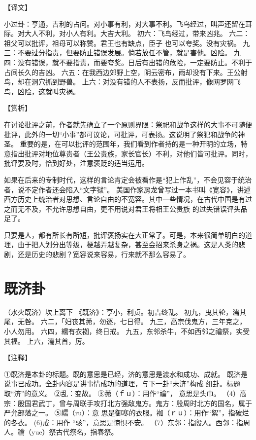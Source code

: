 \documentclass[12pt,UTF8]{ctexbook}
\begin{document}
【译文】

小过卦：亨通，吉利的占问。对小事有利，对大事不利。飞鸟经过，叫声还留在耳际。对大人不利，对小人有利。大吉大利。
初六：飞鸟经过，带来凶兆。
六二：祖父可以批评，祖母可以称赞。君王也有缺点，臣子 也可以夸奖。没有灾祸。
九三：不要过分指责，但要防止错误发展。倘若放任不管，就是害他。凶险。
九四：没有错误，就不要指责，而要夸奖。日后有出错的危险，一定要防止。不利于占间长久的吉凶。
六五：在我西边郊野上空，阴云密布，雨却没有下来。王公射鸟，却在洞穴抓到野兽。
上六：对没有错的人不表扬，反而批评，像网罗网飞鸟，凶险，这就叫灾祸。

【赏析】

在讨论批评之前，作者就先确立了一个原则界限：祭祀和战争这样的大事不可随便批评，此外的一切“小事”都可议论，可批评，可表扬。这说明了祭犯和战争的神圣。 重要的是，在可以批评的范围年，我们看到作者持的是一种开明的立场，特意指出批评对地位尊贵者（王公贵族，家长官长）不利，对他们皆可批评。同时，批评要及时，恰到好处，注意褒贬的适当运用。

如果在后来的专制时代，这样的言论肯定会被看作是“犯上作乱”，不会见容于统治者，说不定作者还会陷入“文字狱”。 美国作家房龙曾写过一本书叫《宽容》，讲述西方历史上统治者对思想、言论自由的不宽容。其中一些情况，在古代中国是有过之而无不及，不允许思想自由，更不用说对君王将相王公贵族 的过失错误评头品足了。

只要是人，都有所长有所短，批评褒扬实在大正常了。可是，本来很简单明白的道理，由于把人划分出等级，梗越弄越复杂，甚至会招来杀身之祸。这是人类的悲剧，还是历史的悲剧？宽容说来容易，行来就不那么容易了。

\chapter{既济卦}

（水火既济）坎上离下
《既济》：亨小，利贞。初吉终乱。
初九，曳其轮，濡其尾，无咎。
六二，「妇丧其茀，勿逐，七日得。
九三，高宗伐鬼方，三年克之，小人勿用。
六四，繻有衣袽，终日戒。
九五，东邻杀牛，不如西邻之禴祭，实受其福。
上六，濡其首，厉。

【注释】

①既济是本卦的标题。既的意思是已经，济的意思是渡水和成功、成就。 既济是说事已成功。全卦内容是讲事情成功的道理，与下一卦“未济”构成 组卦。标题取“济”的意义。
②乱：变故。
③茀（ｆｕ）：用作“禴”， 意思是头巾。
（4）高宗：殷国君武丁，曾与周联手攻打北方强敌鬼方。鬼方：殷周时北方的国名，属于严允部落之一。
⑤繻（ru）：意 思是御寒的衣服。袽（ｒｕ）：用作“絮”，指破烂的冬衣。
(6)戒：用作 “骇”，意思是惊惧不安。
（7）东邻：指殷人。西邻：指周人。禴（yue）祭古代祭名，指春祭。
\end{document}
